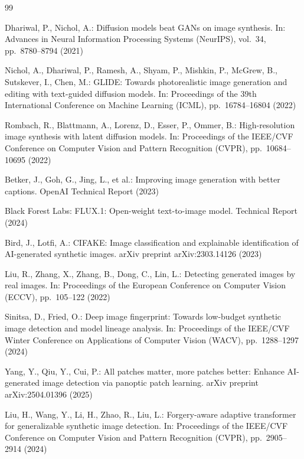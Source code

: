 \documentclass[runningheads]{llncs}
\begin{document}
\begin{thebibliography}{99}

Dhariwal, P., Nichol, A.: Diffusion models beat GANs on image synthesis. In: Advances in Neural Information Processing Systems (NeurIPS), vol.~34, pp.\ 8780--8794 (2021)

Nichol, A., Dhariwal, P., Ramesh, A., Shyam, P., Mishkin, P., McGrew, B., Sutskever, I., Chen, M.: GLIDE: Towards photorealistic image generation and editing with text-guided diffusion models. In: Proceedings of the 39th International Conference on Machine Learning (ICML), pp.\ 16784--16804 (2022)

Rombach, R., Blattmann, A., Lorenz, D., Esser, P., Ommer, B.: High-resolution image synthesis with latent diffusion models. In: Proceedings of the IEEE/CVF Conference on Computer Vision and Pattern Recognition (CVPR), pp.\ 10684--10695 (2022)

Betker, J., Goh, G., Jing, L., et al.: Improving image generation with better captions. OpenAI Technical Report (2023)

Black Forest Labs: FLUX.1: Open-weight text-to-image model. Technical Report (2024)

Bird, J., Lotfi, A.: CIFAKE: Image classification and explainable identification of AI-generated synthetic images. arXiv preprint arXiv:2303.14126 (2023)

Liu, R., Zhang, X., Zhang, B., Dong, C., Lin, L.: Detecting generated images by real images. In: Proceedings of the European Conference on Computer Vision (ECCV), pp.\ 105--122 (2022)

Sinitsa, D., Fried, O.: Deep image fingerprint: Towards low-budget synthetic image detection and model lineage analysis. In: Proceedings of the IEEE/CVF Winter Conference on Applications of Computer Vision (WACV), pp.\ 1288--1297 (2024)

Yang, Y., Qiu, Y., Cui, P.: All patches matter, more patches better: Enhance AI-generated image detection via panoptic patch learning. arXiv preprint arXiv:2504.01396 (2025)

Liu, H., Wang, Y., Li, H., Zhao, R., Liu, L.: Forgery-aware adaptive transformer for generalizable synthetic image detection. In: Proceedings of the IEEE/CVF Conference on Computer Vision and Pattern Recognition (CVPR), pp.\ 2905--2914 (2024)


\end{thebibliography}
\end{document}
